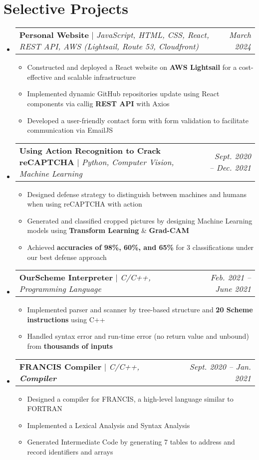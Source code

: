 \documentclass[letterpaper,11pt]{article}
\makeatletter
\newcommand{\HL}[1]{
  \textbf{\textcolor{DukeBlue}{#1}}
}
\newcommand{\subheadingtitlevspace}{
\vspace{-3pt}
}
\newcommand{\resumeItem}[1]{
  \item{
    {#1 \vspace{-4pt}}
  }
}
\newcommand{\titleItem}[1]{
  \textbf{#1}
}
\newcommand{\resumeProjectHeading}[2]{
    \item
    \begin{tabular*}{0.97\textwidth}{l@{\extracolsep{\fill}}r}
      #1 & \textit{ #2} \\
    \end{tabular*}\vspace{-9pt}
}
\newcommand{\resumeSubHeadingListStart}{\subheadingtitlevspace\begin{itemize}[leftmargin=0.15in, label={}]}
\newcommand{\resumeSubHeadingListEnd}{\end{itemize}}
\newcommand{\resumeItemListStart}{
\begin{itemize}}
\newcommand{\resumeItemListEnd}{
\end{itemize}\vspace{-8pt}}
\makeatother
\begin{document}
 \section{Selective Projects}    
  \resumeSubHeadingListStart
    \resumeProjectHeading
      {\titleItem{Personal Website} $|$ \emph{JavaScript, HTML, CSS, React, REST API, AWS (Lightsail, Route 53, Cloudfront)}}{March 2024}
      \resumeItemListStart
        \resumeItem{Constructed and deployed a React website on \HL{AWS Lightsail} for a cost-effective and scalable infrastructure}
        \resumeItem{Implemented dynamic GitHub repositories update using React components via callig \HL{REST API} with Axios}
        \resumeItem{Developed a user-friendly contact form with form validation to facilitate communication via EmailJS}
      \resumeItemListEnd
    \resumeProjectHeading
      {\titleItem{Using Action Recognition to Crack reCAPTCHA} $|$ \emph{Python, Computer Vision, Machine Learning}}{Sept. 2020 -- Dec. 2021}
      \resumeItemListStart
        \resumeItem{Designed defense strategy to distinguish between machines and humans when using reCAPTCHA with action}
        \resumeItem{Generated and classified cropped pictures by designing Machine Learning models using \HL{Transform Learning}\&\HL{Grad-CAM}}
        \resumeItem{Achieved \HL{accuracies of 98\%, 60\%, and 65\%} for 3 classifications under our best defense approach}
      \resumeItemListEnd
    \resumeProjectHeading
      {\titleItem{OurScheme Interpreter} $|$ \emph{C/C++, Programming Language}}{Feb. 2021 -- June 2021}
      \resumeItemListStart
        \resumeItem{Implemented parser and scanner by tree-based structure and \HL{20 Scheme instructions} using C++} 
        \resumeItem{Handled syntax error and run-time error (no return value and unbound) from \HL{thousands of inputs}}
      \resumeItemListEnd
    \resumeProjectHeading
      {\titleItem{FRANCIS Compiler} $|$ \emph{C/C++, \HL{Compiler}}}{Sept. 2020 -- Jan. 2021}
      \resumeItemListStart
        \resumeItem{Designed a compiler for FRANCIS, a high-level language similar to FORTRAN}
        \resumeItem{Implemented a Lexical Analysis and Syntax Analysis}
        \resumeItem{Generated Intermediate Code by generating 7 tables to address and record identifiers and arrays}
      \resumeItemListEnd
  \resumeSubHeadingListEnd


\end{document}
